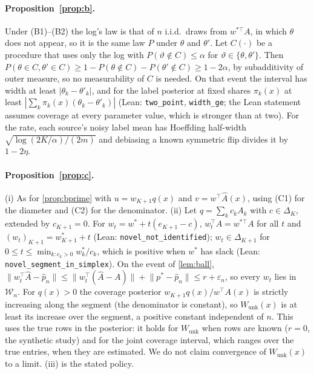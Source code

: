 \documentclass[twoside]{article}
\newcommand{\Wunk}{\ensuremath{W_{\mathrm{unk}}}}
\begin{document}
\paragraph{Proposition~\ref{prop:b}.} Under (B1)--(B2) the log's law is that of $n$ i.i.d.\ draws from
$w^{*\top}A$, in which $\theta$ does not appear, so it is the same law $P$ under $\theta$ and $\theta'$.
Let $C(\cdot)$ be a procedure that uses only the log with $P(\vartheta\notin C)\le\alpha$ for
$\vartheta\in\{\theta,\theta'\}$. Then $P(\theta\in C,\theta'\in C)\ge1-P(\theta\notin C)-P(\theta'\notin C)
\ge1-2\alpha$, by subadditivity of outer measure, so no measurability of $C$ is needed. On that event
the interval has width at least $|\theta_k-\theta'_k|$, and for the label posterior at fixed shares
$\pi_k(x)$ at least $|\sum_k\pi_k(x)(\theta_k-\theta'_k)|$ (Lean: \texttt{two\_point}, \texttt{width\_ge};
the Lean statement assumes coverage at every parameter value, which is stronger than at two). For the rate, each source's
noisy label mean has Hoeffding half-width $\sqrt{\log(2K/\alpha)/(2m)}$ and debiasing a known
symmetric flip divides it by $1-2\eta$.

\paragraph{Proposition~\ref{prop:c}.} (i) As for \cref{prop:bprime} with $u=w_{K+1}q(x)$ and
$v=w^{\top}\hat A(x)$, using (C1) for the diameter and (C2) for the denominator. (ii) Let
$q=\sum_kc_kA_k$ with $c\in\Delta_K$, extended by $c_{K+1}=0$. For $w_t=w^{*}+t(e_{K+1}-c)$,
$w_t^{\top}A=w^{*\top}A$ for all $t$ and $(w_t)_{K+1}=w^{*}_{K+1}+t$ (Lean:
\texttt{novel\_not\_identified}); $w_t\in\Delta_{K+1}$ for $0\le t\le\min_{k:c_k>0}w^{*}_k/c_k$,
which is positive when $w^{*}$ has slack (Lean: \texttt{novel\_segment\_in\_simplex}). On the event of
\cref{lem:ball}, $\lVert w_t^{\top}\hat A-\hat p_n\rVert\le\lVert w_t^{\top}(\hat A-A)\rVert+\lVert p^{*}-\hat p_n\rVert
\le r+\varepsilon_n$, so every $w_t$ lies in $\mathcal W_n$. For $q(x)>0$ the coverage posterior
$w_{K+1}q(x)/w^{\top}A(x)$ is strictly increasing along the segment (the denominator is constant), so
$\Wunk(x)$ is at least its increase over the segment, a positive constant independent of $n$. This
uses the true rows in the posterior: it holds for $\Wunk$ when rows are known ($r=0$, the synthetic
study) and for the joint coverage interval, which ranges over the true entries, when they are
estimated. We do not claim convergence of $\Wunk(x)$ to a limit. (iii) is the stated policy.
\end{document}
